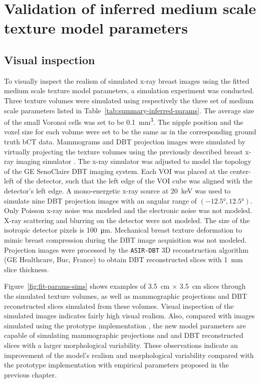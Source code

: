 \documentclass[journal]{IEEEtran}
\begin{document}
\section{Validation of inferred medium scale texture model parameters}
\label{sec:valid-inferr-medi}

\subsection{Visual inspection}
\label{sec:visual-validation-1}

To visually inspect the realism of simulated x-ray breast images using
the fitted medium scale texture model parameters, a simulation
experiment was conducted. Three texture volumes were simulated using
respectively the three set of medium scale parameters listed in
Table~\ref{tab:summary-inferred-params}. The average size of the small
Voronoi cells was set to be \SI{0.1}{\mm\cubed}. The nipple position
and the voxel size for each volume were set to be the same as in the
corresponding ground truth bCT data. Mammograms and DBT projection
images were simulated by virtually projecting the texture volumes
using the previously described breast x-ray imaging simulator
\cite{milioni2014low}. The x-ray simulator was adjusted to model the
topology of the GE SenoClaire DBT imaging system. Each VOI was placed
at the center-left of the detector, such that the left edge of the VOI
cube was aligned with the detector's left edge. A mono-energetic x-ray
source at \SI{20}{\keV} was used to simulate nine DBT projection
images with an angular range of $( \ang{-12.5}, \ang{12.5} )$. Only
Poisson x-ray noise was modeled and the electronic noise was not
modeled. X-ray scattering and blurring on the detector were not
modeled. The size of the isotropic detector pixels is
\SI{100}{\um}. Mechanical breast texture deformation to mimic breast
compression during the DBT image acquisition was not
modeled. Projection images were processed by the \texttt{ASIR-DBT} 3D
reconstruction algorithm (GE Healthcare, Buc, France) to obtain DBT
reconstructed slices with \SI{1}{\mm} slice thickness.

Figure~\ref{fig:fit-params-sims} shows examples of \SI{3.5}{\cm}
$\times$ \SI{3.5}{\cm} slices through the simulated texture volumes,
as well as mammographic projections and DBT reconstructed slices
simulated from these volumes. Visual inspection of the simulated
images indicates fairly high visual realism. Also, compared with
images simulated using the prototype implementation
\cite{li2016novel}, the new model parameters are capable of simulating
mammographic projections and and DBT reconstructed slices with a
larger morphological variability. These observations indicate an
improvement of the model's realism and morphological variability
compared with the prototype implementation with empirical parameters
proposed in the previous chapter.
\end{document}
